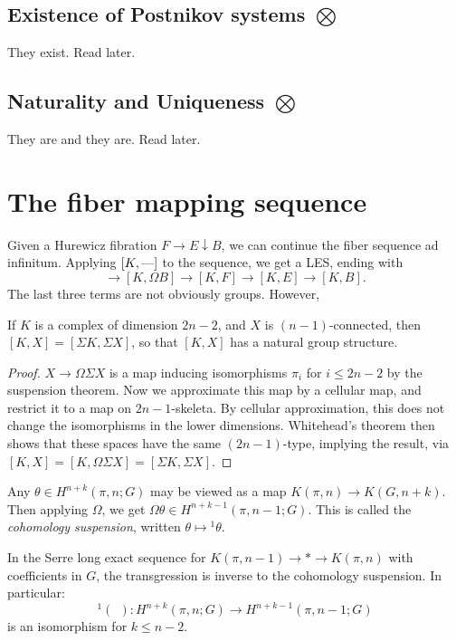 \documentclass[11pt]{article}
\begin{document}
\subsection{Existence of Postnikov systems \texorpdfstring{$\bigotimes$}{}}
They exist. Read later.
\subsection{Naturality and Uniqueness \texorpdfstring{$\bigotimes$}{}}
They are and they are. Read later.

\section{The fiber mapping sequence}
Given a Hurewicz fibration $F\rightarrow E\downarrow B$, we can continue the
fiber sequence ad infinitum. Applying $[K,\textup{---}]$ to the sequence, we get a LES,
ending with
\[\rightarrow[K,\Omega B]\rightarrow [K,F]\rightarrow [K,E]\rightarrow [K,B].\]
The last three terms are not obviously groups. However,
\begin{prop*}\label{StableRange}
If $K$ is a complex of dimension $2n-2$, and $X$ is $(n-1)$-connected, then
$[K,X]=[\Sigma K,\Sigma X]$, so that $[K,X]$ has a natural group structure.
\end{prop*}
\begin{proof}
$X\to\Omega\Sigma X$ is a map inducing isomorphisms $\pi_i$ for $i\leq2n-2$ by
the suspension theorem. Now we approximate this map by a cellular map, and
restrict it to a map on $2n-1$-skeleta. By cellular approximation, this does not
change the isomorphisms in the lower dimensions. Whitehead's theorem then shows
that these spaces have the same $(2n-1)$-type, implying the result, via
$[K,X]=[K,\Omega\Sigma X]=[\Sigma K,\Sigma X]$.
\end{proof}
Any $\theta\in H^{n+k}(\pi,n;G)$ may be viewed as a map $K(\pi,n)\to K(G,n+k)$.
Then applying $\Omega$, we get $\Omega\theta\in H^{n+k-1}(\pi,n-1;G)$. This
is called the \emph{cohomology suspension}, written $\theta\mapsto {^1\theta}$.
\begin{lem*}\label{cohSusp}
In the Serre long exact sequence for $K(\pi,n-1)\to*\to K(\pi,n)$ with
coefficients in $G$, the transgression is inverse to the cohomology suspension.
In particular:
\[^1(\ \ ):H^{n+k}(\pi,n;G)\to H^{n+k-1}(\pi,n-1;G)\]
is an isomorphism for $k\leq n-2$.
\end{lem*}
\end{document}
